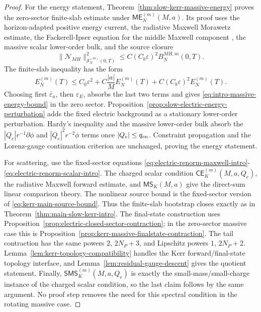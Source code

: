 \documentclass[11pt]{article}
\numberwithin{equation}{section}
\theoremstyle{plain}
\theoremstyle{definition}
\theoremstyle{remark}
\newcommand{\CElec}{\mathsf{CE}}
\newcommand{\ME}{\mathsf{ME}}
\newcommand{\MScat}{\mathsf{MS}}
\newcommand{\SMS}{\mathsf{SMS}}
\begin{document}
\begin{proof}
For the energy statement, Theorem~\ref{thm:slow-kerr-massive-energy} proves the zero-sector finite-slab estimate under \(\ME_N^{(m)}(M,a)\).  Its proof uses the horizon-adapted positive energy current, the radiative Maxwell Morawetz estimate, the Fackerell-Ipser equation for the middle Maxwell component \cite{FackerellIpser}, the massive scalar lower-order bulk, and the source closure
\begin{equation}\label{eq:intro-F-source-closure}
 \|\mathcal N_{MH}\|_{\mathcal S_N^{(m)}(0,T)}^2
 \le C(C_b\varepsilon)^2 B^{MH,m}_N(0,T).
\end{equation}
The finite-slab inequality has the form
\begin{equation}\label{eq:intro-F-absorption}
 E_N^{(m)}(T)
 \le C_0\varepsilon^2+C\frac{|a|}{M}E_N^{(m)}(T)+C(C_b\varepsilon)^2E_N^{(m)}(T).
\end{equation}
Choosing first \(\bar\varepsilon_a\), then \(\varepsilon_E\), absorbs the last two terms and gives \eqref{eq:intro-massive-energy-bound} in the zero sector.  Proposition~\ref{prop:slow-electric-energy-perturbation} adds the fixed electric background as a stationary lower-order perturbation.  Hardy's inequality and the massive lower-order bulk absorb the \(|Q_e|r^{-1}\partial\phi\) and \(|Q_e|^2r^{-2}\phi\) terms once \(|Q_e|\le q_{\rm en}\).  Constraint propagation and the Lorenz-gauge continuation criterion are unchanged, proving the energy statement.

For scattering, use the fixed-sector equations \eqref{eq:electric-renorm-maxwell-intro}-\eqref{eq:electric-renorm-scalar-intro}.  The charged scalar condition \(\CElec_K^{(m)}(M,a,Q_e)\), the radiative Maxwell forward estimate, and \(\MScat_K(M,a)\) give the direct-sum linear comparison theory.  The nonlinear source bound is the fixed-sector version of \eqref{eq:kerr-main-source-bound}.  Thus the finite-slab bootstrap closes exactly as in Theorem~\ref{thm:main-slow-kerr-intro}.  The final-state construction uses Proposition~\ref{prop:electric-closed-sector-contraction}; in the zero-sector massive case this is Proposition~\ref{prop:kerr-massive-finalstate-contraction}.  The tail contraction has the same powers \(2\), \(2N_P+3\), and Lipschitz powers \(1\), \(2N_P+2\).  Lemma~\ref{lem:kerr-topology-compatibility} handles the Kerr forward/final-state topology interface, and Lemma~\ref{lem:residual-gauge-descent} gives the quotient statement.  Finally, \(\SMS_K^{(m)}(M,a,Q_e)\) is exactly the small-mass/small-charge instance of the charged scalar condition, so the last claim follows by the same argument.  No proof step removes the need for this spectral condition in the rotating massive case.
\end{proof}
\end{document}
